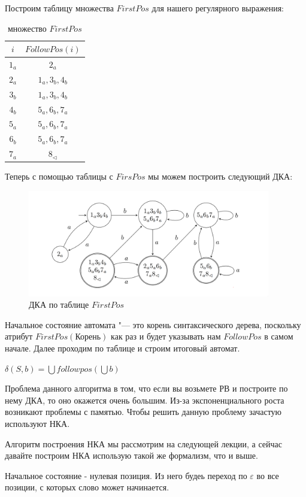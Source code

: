 Построим таблицу множества $FirstPos$ для нашего регулярного выражения:
\begin{table}[h!]
    \centering
    \begin{tabular}{c|c}
        $i$   & $FollowPos(i)$ \\ \hline
        $1_a$ & $2_a$          \\
        $2_a$ & $1_a,3_b,4_b$  \\
        $3_b$ & $1_a,3_b,4_b$  \\
        $4_b$ & $5_a,6_b,7_a$  \\
        $5_a$ & $5_a,6_b,7_a$  \\
        $6_b$ & $5_a,6_b,7_a$  \\
        $7_a$ & $8_{\lhd}$
    \end{tabular}
    \caption{множество $FirstPos$}
\end{table}

Теперь с помощью таблицы с $FirsPos$ мы можем построить следующий ДКА:
\begin{figure}[ht!p]
    \centering
    \includegraphics[width = 400px]{images/DKA.PNG}
    \caption{ДКА по таблице $FirstPos$}
    \label{fig:DFA}
\end{figure}

Начальное состояние автомата "--- это корень синтаксического дерева, поскольку атрибут $FirstPos(\text{Корень})$ как раз и будет указывать нам $FollowPos$ в самом начале. Далее проходим по таблице и строим итоговый автомат.


$\delta(S,b) = \bigcup followpos(\bigcup b)$

Проблема данного алгоритма в том, что если вы возьмете РВ и построите по нему ДКА, то оно окажется очень большим. Из-за экспоненциального роста возникают проблемы с памятью. Чтобы решить данную проблему зачастую используют НКА.

Алгоритм построения НКА мы рассмотрим на следующей лекции, а сейчас давайте построим НКА использую такой же  формализм, что и выше.

Начальное состояние - нулевая позиция. Из него будеь переход по $\varepsilon$ во все позиции, с которых слово может начинается.

